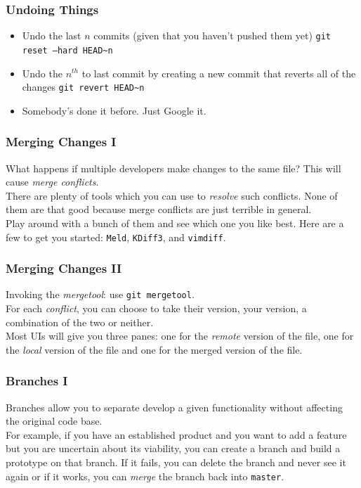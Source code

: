 \documentclass{lug}
\begin{document}
\begin{frame}
    \frametitle{Undoing Things}

    \begin{itemize}
        \item Undo the last $n$ commits (given that you haven't pushed them yet) \texttt{git reset
            --hard HEAD\textasciitilde n}
        \item Undo the $n^{th}$ to last commit by creating a new commit that reverts all of the
            changes \texttt{git revert HEAD\textasciitilde n}
        \item Somebody's done it before. Just Google it.
    \end{itemize}
\end{frame}

\begin{frame}
    \frametitle{Merging Changes I}

    What happens if multiple developers make changes to the same file? This will cause \textit{merge
    conflicts}.\\

    There are plenty of tools which you can use to \textit{resolve} such conflicts. None of them are
    that good because merge conflicts are just terrible in general.\\

    Play around with a bunch of them and see which one you like best. Here are a few to get you
    started: \texttt{Meld}, \texttt{KDiff3}, and \texttt{vimdiff}.\\
\end{frame}

\begin{frame}
    \frametitle{Merging Changes II}

    Invoking the \textit{mergetool}: use \texttt{git mergetool}.\\

    For each \textit{conflict}, you can choose to take their version, your version, a combination of
    the two or neither.\\

    Most UIs will give you three panes: one for the \textit{remote} version of the file, one for the
    \textit{local} version of the file and one for the merged version of the file.

\end{frame}

\begin{frame}
    \frametitle{Branches I}

    Branches allow you to separate develop a given functionality without affecting the original code
    base.\\

    For example, if you have an established product and you want to add a feature but you are
    uncertain about its viability, you can create a branch and build a prototype on that branch. If
    it fails, you can delete the branch and never see it again or if it works, you can
    \textit{merge} the branch back into \texttt{master}.
\end{frame}
\end{document}
